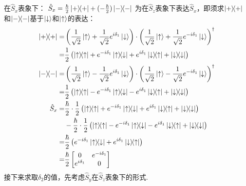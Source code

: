 \begin{derivation}
    在$\hat{S}_x$表象下：
    $\hat{S}_x = \frac{\hbar}{2} \ketbra{+}{+} + (-\frac{\hbar}{2}) \ketbra{-}{-}$
    为在$\hat{S}_z$表象下表达$\hat{S}_x$，即须求$\ketbra{+}{+}$和$\ketbra{-}{-}$基于$\ket{\downarrow}$和$\ket{\uparrow}$的表达：
    \begin{align*}
        \ketbra{+}{+} =& \left( \frac{1}{\sqrt{2}} \ket{\uparrow} + \frac{1}{\sqrt{2}} e^{i\delta_1} \ket{\downarrow} \right) \cdot \left( \frac{1}{\sqrt{2}} \ket{\uparrow} + \frac{1}{\sqrt{2}} e^{-i\delta_1} \ket{\downarrow} \right)^{\dagger} \\
        =& \frac{1}{2} \left( \ketbra{\uparrow}{\uparrow} + e^{-i\delta_1} \ketbra{\uparrow}{\downarrow} + e^{i\delta_1} \ketbra{\downarrow}{\uparrow} + \ketbra{\downarrow}{\downarrow} \right) \\
        \ketbra{-}{-} =& \left( \frac{1}{\sqrt{2}} \ket{\uparrow} - \frac{1}{\sqrt{2}} e^{i\delta_1} \ket{\downarrow} \right) \cdot \left( \frac{1}{\sqrt{2}} \ket{\uparrow} - \frac{1}{\sqrt{2}} e^{-i\delta_1} \ket{\downarrow} \right)^{\dagger} \\
        =& \frac{1}{2} \left( \ketbra{\uparrow}{\uparrow} - e^{-i\delta_1} \ketbra{\uparrow}{\downarrow} - e^{i\delta_1} \ketbra{\downarrow}{\uparrow} + \ketbra{\downarrow}{\downarrow} \right) \\
        \hat{S}_x =& \frac{\hbar}{2} \cdot \frac{1}{2} \left( \ketbra{\uparrow}{\uparrow} + e^{-i\delta_1} \ketbra{\uparrow}{\downarrow} + e^{i\delta_1} \ketbra{\downarrow}{\uparrow} + \ketbra{\downarrow}{\downarrow} \right) \\
        &- \frac{\hbar}{2} \cdot \frac{1}{2} \left( \ketbra{\uparrow}{\uparrow} - e^{-i\delta_1} \ketbra{\uparrow}{\downarrow} - e^{i\delta_1} \ketbra{\downarrow}{\uparrow} + \ketbra{\downarrow}{\downarrow} \right) \\
        =& \frac{\hbar}{2} \left( e^{-i\delta_1} \ketbra{\uparrow}{\downarrow} + e^{i\delta_1} \ketbra{\downarrow}{\uparrow} \right) \\
        =& \frac{\hbar}{2} \begin{bmatrix} 0 & e^{-i\delta_1} \\ e^{i\delta_1} & 0 \end{bmatrix}
    \end{align*}
    接下来求取$\delta_2$的值，先考虑$\hat{S}_y$在$\hat{S}_z$表象下的形式.
    

\end{derivation}
